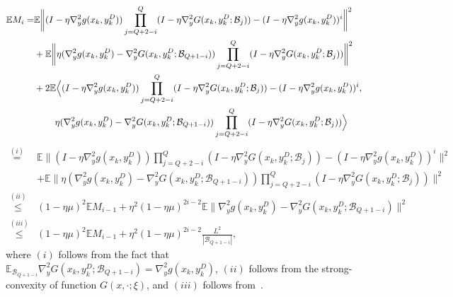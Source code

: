 \documentclass{osudissert96}
\def\gB{{\mathcal{B}}}
\begin{document}
{\small\begin{align}
\mathbb{E}M_i =&\mathbb{E}\bigg\| (I - \eta \nabla_y^2g(x_k,y_k^D))\prod_{j=Q+2-i}^Q (I - \eta \nabla_y^2G(x_k,y_k^D;\gB_j)) -  (I - \eta \nabla_y^2g(x_k,y_k^D))^i \bigg \|^2 \nonumber
\\&+ \mathbb{E}\bigg\| \eta( \nabla_y^2g(x_k,y_k^D)-\nabla_y^2G(x_k,y_k^D;\gB_{Q+1-i}) ) \prod_{j=Q+2-i}^Q (I - \eta \nabla_y^2G(x_k,y_k^D;\gB_j)) \bigg \|^2 \nonumber
\\&+ 2\mathbb{E}\Big\langle(I - \eta \nabla_y^2g(x_k,y_k^D))\prod_{j=Q+2-i}^Q (I - \eta \nabla_y^2G(x_k,y_k^D;\gB_j)) -  (I - \eta \nabla_y^2g(x_k,y_k^D))^i, \nonumber
\\&\hspace{0.8cm}\eta( \nabla_y^2g(x_k,y_k^D)-\nabla_y^2G(x_k,y_k^D;\gB_{Q+1-i}) ) \prod_{j=Q+2-i}^Q (I - \eta \nabla_y^2G(x_k,y_k^D;\gB_j)) \Big\rangle \nonumber
\end{align}}
{\small
\begin{align}\label{eq:mq}
\overset{(i)}=&\mathbb{E}\bigg\| (I - \eta \nabla_y^2g(x_k,y_k^D))\prod_{j=Q+2-i}^Q (I - \eta \nabla_y^2G(x_k,y_k^D;\gB_j)) -  (I - \eta \nabla_y^2g(x_k,y_k^D))^i \bigg \|^2 \nonumber
\\&+ \mathbb{E}\bigg\|\eta( \nabla_y^2g(x_k,y_k^D)-\nabla_y^2G(x_k,y_k^D;\gB_{Q+1-i}) ) \prod_{j=Q+2-i}^Q (I - \eta \nabla_y^2G(x_k,y_k^D;\gB_j))\bigg \|^2 \nonumber
\\\overset{(ii)} \leq&(1-\eta\mu)^2\mathbb{E}M_{i-1} + \eta^2(1-\eta\mu)^{2i-2} \mathbb{E}\| \nabla_y^2g(x_k,y_k^D)-\nabla_y^2G(x_k,y_k^D;\gB_{Q+1-i}) \|^2 \nonumber
\\ \overset{(iii)}\leq&(1-\eta\mu)^2\mathbb{E} M_{i-1}+ \eta^2(1-\eta\mu)^{2i-2} \frac{L^2}{|\gB_{Q+1-i}|},
\end{align}}
\hspace{-0.15cm}where $(i)$ follows from the fact that $\mathbb{E}_{\gB_{Q+1-i}}\nabla_y^2G(x_k,y_k^D;\gB_{Q+1-i})  = \nabla_y^2g(x_k,y_k^D)$, $(ii)$ follows from the strong-convexity of function $G(x,\cdot;\xi)$, and $(iii)$ follows from~.
\end{document}
